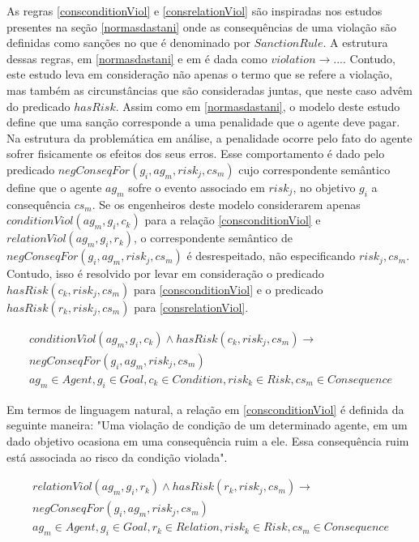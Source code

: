As regras \ref{consconditionViol} e \ref{consrelationViol} são inspiradas nos estudos presentes na seção \ref{normasdastani} onde as consequências de uma violação são definidas como sanções no que é denominado por $Sanction Rule$. A estrutura dessas regras, em \ref{normasdastani} e em \cite{dastaniframework} é dada como $violation \to ... $. Contudo, este estudo leva em consideração não apenas o termo que se refere a violação, mas também as circunstâncias que são consideradas juntas, que neste caso advêm do predicado $hasRisk$. Assim como em \ref{normasdastani}, o modelo deste estudo define que uma sanção corresponde a uma penalidade que o agente deve pagar. Na estrutura da problemática em análise, a penalidade ocorre pelo fato do agente sofrer fisicamente os efeitos dos seus erros. Esse comportamento é dado pelo predicado $negConseqFor(g_i,ag_m,risk_j,cs_m)$ cujo correspondente semântico define que o agente $ag_m$ sofre o evento associado em $risk_j$, no objetivo $g_i$ a consequência $cs_m$. Se os engenheiros deste modelo considerarem apenas $conditionViol(ag_m,g_i,c_k)$ para a relação \ref{consconditionViol} e $relationViol(ag_m,g_i,r_k)$, o correspondente semântico de $negConseqFor(g_i,ag_m,risk_j,cs_m)$ é desrespeitado, não especificando $risk_j,cs_m$. Contudo, isso é resolvido por levar em consideração o predicado $hasRisk(c_k,risk_j,cs_m)$ para \ref{consconditionViol} e o predicado $hasRisk(r_k,risk_j,cs_m)$ para \ref{consrelationViol}. 

\begin{eqnarray}\label{consconditionViol}\nonumber
	conditionViol(ag_m,g_i,c_k)  \wedge hasRisk(c_k,risk_j,cs_m) \to \nonumber \\ 
	negConseqFor(g_i,ag_m,risk_j,cs_m) \nonumber \\ 
    ag_m \in Agent, g_i \in Goal, c_k \in Condition, risk_k \in Risk, cs_m \in Consequence
\end{eqnarray}

Em termos de linguagem natural, a relação em \ref{consconditionViol} é definida da seguinte maneira: "Uma violação de condição de um determinado agente, em um dado objetivo ocasiona em uma consequência ruim a ele. Essa consequência ruim está associada ao risco da condição violada". 

\begin{eqnarray}\label{consrelationViol}\nonumber
	relationViol(ag_m,g_i,r_k) \wedge hasRisk(r_k,risk_j,cs_m) \to \\ 
	negConseqFor(g_i,ag_m,risk_j,cs_m) \nonumber \\ 
    ag_m \in Agent, g_i \in Goal, r_k \in Relation, risk_k \in Risk, cs_m \in Consequence 
\end{eqnarray}

